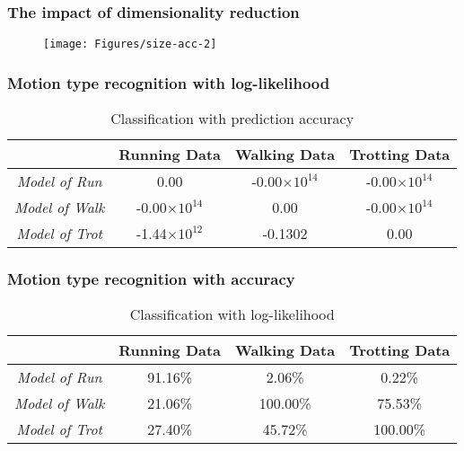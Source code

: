 \documentclass[serif,mathserif]{beamer}
\begin{document}

\begin{frame}
	\frametitle{The impact of dimensionality reduction}
	\begin{figure}[t]
		\texttt{[image: Figures/size-acc-2]}
	\end{figure}
\end{frame}

\begin{frame}
	\frametitle{Motion type recognition with log-likelihood}
	\begin{table}[h!] 
		\centering
  		\begin{tabular}{c|c|c|c} 	
			\hline	
			\hline
			& Running Data &  Walking Data & Trotting Data\\ 
			\hline
			\textit{Model of Run} & 0.00  & -0.00\(\times10^{14}\)   & -0.00\(\times10^{14}\)\\ 
			\hline
			\textit{Model of Walk}  & -0.00\(\times10^{14}\)  &  0.00  & -0.00\(\times10^{14}\)\\ 
			\hline
			\textit{Model of Trot}  & -1.44\(\times10^{12}\)  &  -0.1302  & 0.00\\	
			\hline  
		\end{tabular}
		\caption{Classification with prediction accuracy}
	\end{table}
\end{frame}

\begin{frame}
	\frametitle{Motion type recognition with accuracy}
	\begin{table}[h!] 		
		\centering
		\begin{tabular}{ c|c|c|c} 	
			\hline
			\hline	
			& Running Data &  Walking Data & Trotting Data\\ 
			\hline
			\hline
			\textit{Model of Run} & 91.16\% & 2.06\% & 0.22\% \\ 
			\hline
			\textit{Model of Walk} & 21.06\% & 100.00\% & 75.53\% \\ 
			\hline
			\textit{Model of Trot} & 27.40\% & 45.72\% & 100.00\%\\	
			\hline
		\end{tabular}
		\caption{Classification with log-likelihood}
	\end{table}
\end{frame}
\end{document}
